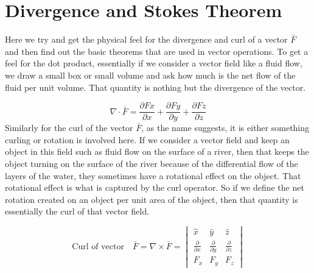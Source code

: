 \section{Divergence and Stokes Theorem}\label{lec:lec17}
Here we try and get the physical feel for the divergence and curl of a vector $\bar{F}$  and then find out the basic theorems that are used in vector operations.
To get a feel for the dot product, essentially if we consider a vector field like a fluid flow, we draw a small box or small volume and ask how much is the net flow of the fluid per unit volume. That quantity is nothing but the divergence of the vector.

\begin{equation}
\nabla\cdot \bar{F} = \frac{\partial Fx}{\partial x} + \frac{\partial Fy}{\partial y} + \frac{\partial Fz}{\partial z}	
\end{equation}
Similarly for the curl of the vector $\bar{F}$, as the name suggests, it is either something curling or rotation is involved here. If we consider a vector field and keep an object in this field such as fluid flow on the surface of a river, then that keeps the object turning on the surface of the river because of the differential flow of the layers of the water, they sometimes have a rotational effect on the object. That rotational effect is what is captured by the curl operator. So if we define the net rotation created on an object per unit area of the object, then that quantity is essentially the curl of that vector field.

\begin{dmath}
\text{Curl of vector} \quad \bar{F} = \nabla \times \bar{F} = 
\begin{vmatrix}
\hat{x} & \hat{y} & \hat{z}\\
\frac{\partial}{\partial x} & \frac{\partial}{\partial y} & \frac{\partial}{\partial z}\\
F_{x} & F_{y} & F_{z}
\end{vmatrix}
\end{dmath}

